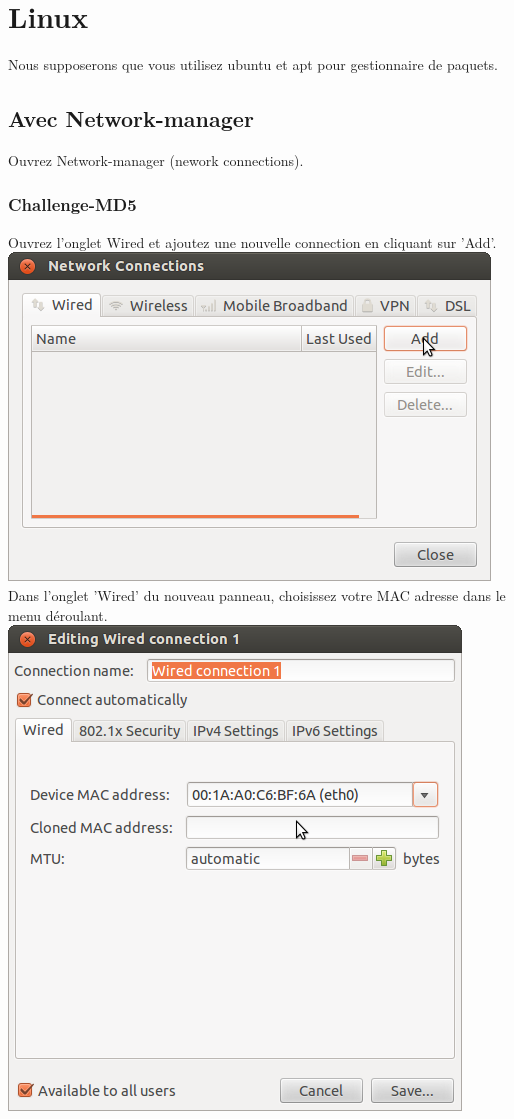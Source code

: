 \section{Linux}
Nous supposerons que vous utilisez ubuntu et apt pour gestionnaire de paquets.


\subsection{Avec Network-manager}

Ouvrez Network-manager (nework connections).
\subsubsection{Challenge-MD5}
Ouvrez l'onglet Wired et ajoutez une nouvelle connection en cliquant sur 'Add'.\\
\includegraphics[width=\screenShotSize{}]{img/wiredAdd.png}\\
Dans l'onglet 'Wired' du nouveau panneau, choisissez votre MAC adresse dans le menu déroulant.\\
\includegraphics[width=\screenShotSize{}]{img/setMac.png}\\

